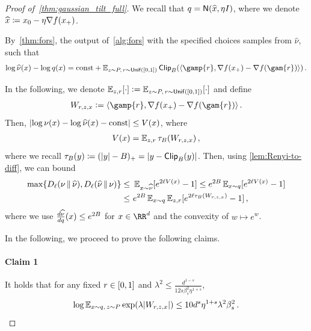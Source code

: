 \begin{proof}[Proof of~\cref{thm:gaussian_tilt_full}]
We recall that $q=\normal{\xhat,\eta\Id}$, where we denote $\widehat x \deq x_0 - \eta\nabla f(x_+)$.

By~\cref{thm:fors}, the output of~\cref{alg:fors} with the specified choices samples from $\widehat\nu$, such that
\begin{align*}
    \log \wh\nu(x)-\log q(x)=\const+\En_{z\sim P,\,r\sim\unif([0,1])}\pclip{\tri{\gamp{\lr}, \nabla f(\xp)-\nabla f(\gam{\lr})}}\,.
\end{align*}


In the following, we denote $\En_{z,r}[\cdot]\ldef \En_{z\sim P,\,r\sim\unif([0,1])}[\cdot]$ and define
\begin{align*}
    W_{r,z,x}
    \ldef\tri{\gamp{\lr}, \nabla f(\xp) - \nabla f(\gam{\lr})}\,.
\end{align*}
Then, $\abs{\log\rgo(x)-\log \wh\nu(x)-\const}\leq V(x)$, where
\begin{align*}
    V(x)=\En_{z,r}\trunc{W_{r,z,x}}\,,
\end{align*}
where we recall $\trunc[\B]{y}\deq(\abs{y}-\B)_+=|y-\pclip{y}|$. Then, using \cref{lem:Renyi-to-diff}, we can bound
\begin{align}\label{pfeq:RGO-Renyi}
\begin{aligned}
    \max\crl*{ \Dren[\ell]{\nu}{\nuhat}, \Dren[\ell]{\nuhat}{\nu} }
    \leq&~ \En_{x\sim \nuhat}\brk{ e^{2\ell V(x)}-1 }
    \leq e^{2B}\En_{x\sim q}\brk{ e^{2\ell V(x)}-1 } \\
    \leq&~ e^{2B}\En_{x\sim q}\En_{z,r}\brk{ e^{2\ell\trunc{W_{r,z,x}}}-1 }\,,
\end{aligned}
\end{align}
where we use $\frac{d\nuhat}{dq}(x)\leq e^{2B}$ for $x\in\RR^d$ and the convexity of $w\mapsto e^w$.

In the following, we proceed to prove the following claims.

\paragraph{Claim 1}
It holds that for any fixed $\lr\in[0,1]$ and $\lambda^2\leq \frac{d^{1-s}}{12s\beta_s^2\eta^{1+s}}$,
\begin{align*}
    \log \En_{x\sim q,\,z\sim P}\exp\prn*{\lambda \abs{W_{r,z,x}}}\leq 10 d^s \eta^{1+s}\lambda^2\beta_s^2\,.
\end{align*}


\end{proof}

